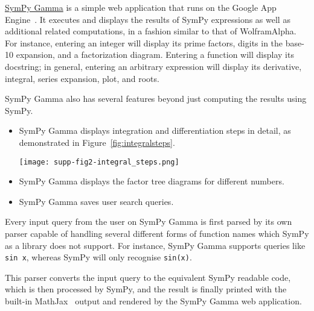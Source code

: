\href{http://sympygamma.com}{SymPy Gamma} is a simple web application that
runs on the Google App Engine~\cite{ciurana2009developing}. It executes and
displays the results of SymPy expressions as well as additional related
computations, in a fashion similar to that of Wolfram\textbar{}Alpha. For
instance, entering an integer will display its prime factors, digits in the
base-10 expansion, and a factorization diagram. Entering a function will
display its docstring; in general, entering an arbitrary expression will
display its derivative, integral, series expansion, plot, and roots.

SymPy Gamma also has several features beyond just computing the
results using SymPy.

\begin{itemize}
\item
  SymPy Gamma displays integration and differentiation steps in detail, as
  demonstrated in Figure~\ref{fig:integralsteps}.\par
  {
    \centering
    \texttt{[image: supp-fig2-integral\_steps.png]}
    \label{fig:integralsteps}
    \par
  }
\item
  SymPy Gamma displays the factor tree diagrams for different numbers.
\item
  SymPy Gamma saves user search queries.
\end{itemize}
Every input query from the user on SymPy Gamma is first parsed by its
own parser capable of handling several different forms of function names
which SymPy as a library does not support. For instance, SymPy Gamma
supports queries like \texttt{sin\ x}, whereas SymPy will only recognise
\verb|sin(x)|.

This parser converts the input query to the equivalent SymPy readable code,
which is then processed by SymPy, and the result is finally printed with the
built-in MathJax~\cite{cervone2012mathjax} output and rendered by the SymPy
Gamma web application.
